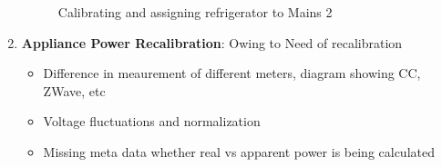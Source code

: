 \documentclass[conference]{IEEEtran}
\begin{document}
\begin{enumerate}
\begin{figure}
  	\caption{Calibrating and assigning refrigerator to Mains 2 }
    \label{fig:assignment}
\end{figure}

\item \textbf{Appliance Power Recalibration}: 
Owing to 
Need of recalibration
\begin{itemize}
\item Difference in meaurement of different meters, diagram showing CC, ZWave, etc
\item Voltage fluctuations and normalization
\item Missing meta data whether real vs apparent power is being calculated


\end{itemize}
\end{enumerate}
\end{document}
